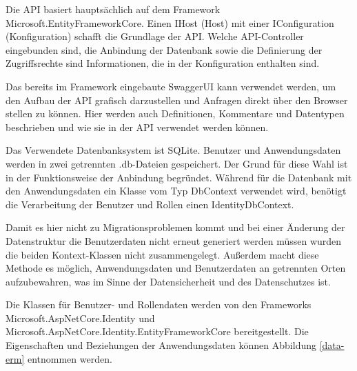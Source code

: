 Die API basiert hauptsächlich auf dem Framework Microsoft.EntityFrameworkCore.
Einen IHost (Host) mit einer IConfiguration (Konfiguration) schafft die Grundlage der API.
Welche API-Controller eingebunden sind, die Anbindung der Datenbank sowie die Definierung der Zugriffsrechte sind Informationen, die in der Konfiguration enthalten sind.

Das bereits im Framework eingebaute SwaggerUI kann verwendet werden, um den Aufbau der API grafisch darzustellen und Anfragen direkt über den Browser stellen zu können.
Hier werden auch Definitionen, Kommentare und Datentypen beschrieben und wie sie in der API verwendet werden können.
\linebreak

Das Verwendete Datenbanksystem ist SQLite.
Benutzer und Anwendungsdaten werden in zwei getrennten .db-Dateien gespeichert.
Der Grund für diese Wahl ist in der Funktionsweise der Anbindung begründet.
Während für die Datenbank mit den Anwendungsdaten ein Klasse vom Typ DbContext verwendet wird, benötigt die Verarbeitung der Benutzer und Rollen einen IdentityDbContext.

Damit es hier nicht zu Migrationsproblemen kommt und bei einer Änderung der Datenstruktur die Benutzerdaten nicht erneut generiert werden müssen wurden die beiden Kontext-Klassen nicht zusammengelegt.
Außerdem macht diese Methode es möglich, Anwendungsdaten und Benutzerdaten an getrennten Orten aufzubewahren, was im Sinne der Datensicherheit und des Datenschutzes ist.

Die Klassen für Benutzer- und Rollendaten werden von den Frameworks Microsoft.AspNetCore.Identity und Microsoft.AspNetCore.Identity.EntityFrameworkCore bereitgestellt. Die Eigenschaften und Beziehungen der Anwendungsdaten können Abbildung \vref{data-erm} entnommen werden.

